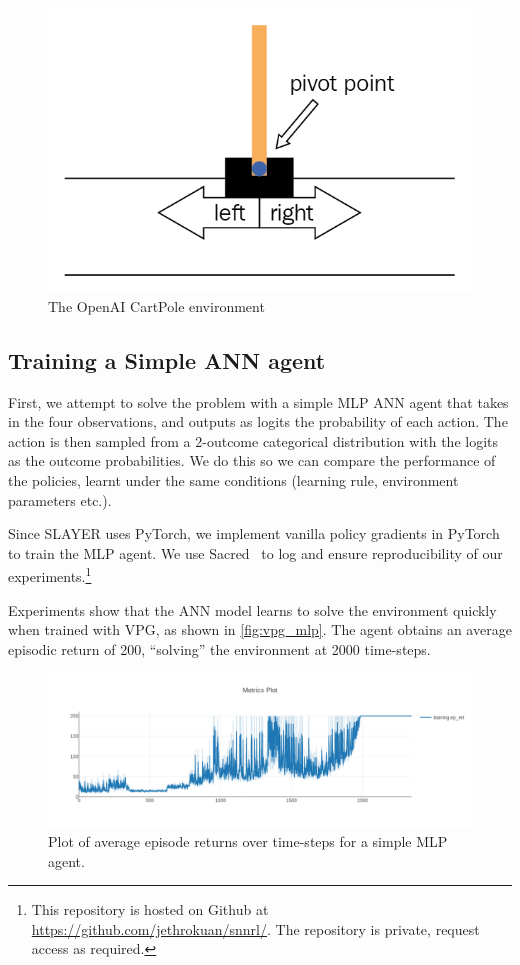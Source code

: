 \documentclass[fyp]{socreport}
\begin{document}
\begin{figure}[htbp] \centering
  \includegraphics[width=.9\linewidth]{images/openai_gym.png}
  \caption{The OpenAI CartPole environment}
\end{figure}

\subsection{Training a Simple ANN agent}

First, we attempt to solve the problem with a simple MLP ANN agent that takes in
the four observations, and outputs as logits the probability of each action. The
action is then sampled from a 2-outcome categorical distribution with the logits
as the outcome probabilities. We do this so we can compare the performance of
the policies, learnt under the same conditions (learning rule, environment
parameters etc.).

Since SLAYER uses PyTorch, we implement vanilla policy gradients in PyTorch to
train the MLP agent. We use Sacred~\cite{klaus_greff-proc-scipy-2017} to log and
ensure reproducibility of our experiments.\footnote{This repository is hosted on
Github at \url{https://github.com/jethrokuan/snnrl/}. The repository is private,
request access as required.}

Experiments show that the ANN model learns to solve the environment quickly when
trained with VPG, as shown in \autoref{fig:vpg_mlp}. The agent obtains an
average episodic return of 200, ``solving'' the environment at 2000 time-steps.

\begin{figure}[htbp] \centering
\includegraphics[width=.9\linewidth]{images/vpg_mlp.png}
\caption{\label{fig:vpg_mlp} Plot of average episode returns over time-steps for
a simple MLP agent.}
\end{figure}
\end{document}
